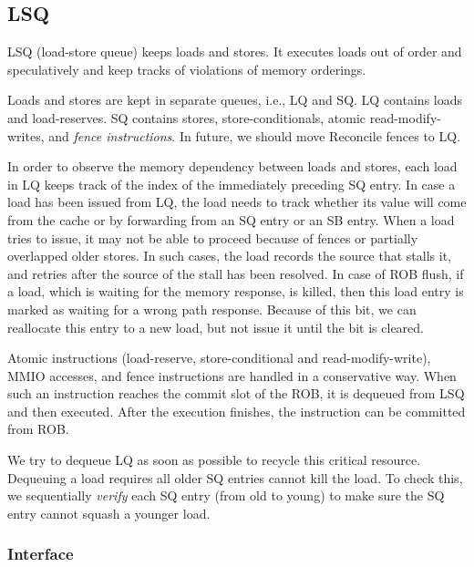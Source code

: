 \subsection{LSQ}\label{sec:lsq}

LSQ (load-store queue) keeps loads and stores.
It executes loads out of order and speculatively and keep tracks of violations of memory orderings.

Loads and stores are kept in separate queues, i.e., LQ and SQ.
LQ contains loads and load-reserves.
SQ contains stores, store-conditionals, atomic read-modify-writes, and \emph{fence instructions}.
In future, we should move Reconcile fences to LQ.

In order to observe the memory dependency between loads and stores, each load in LQ keeps track of the index of the immediately preceding SQ entry.
In case a load has been issued from LQ, the load needs to track whether its value will come from the cache or by forwarding from an SQ entry or an SB entry.
When a load tries to issue, it may not be able to proceed because of fences or partially overlapped older stores.
In such cases, the load records the source that stalls it, and retries after the source of the stall has been resolved.
In case of ROB flush, if a load, which is waiting for the memory response, is killed, then this load entry is marked as waiting for a wrong path response.
Because of this bit, we can reallocate this entry to a new load, but not issue it until the bit is cleared.

Atomic instructions (load-reserve, store-conditional and read-modify-write), MMIO accesses, and fence instructions are handled in a conservative way.
When such an instruction reaches the commit slot of the ROB, it is dequeued from LSQ and then executed.
After the execution finishes, the instruction can be committed from ROB.

We try to dequeue LQ as soon as possible to recycle this critical resource.
Dequeuing a load requires all older SQ entries cannot kill the load.
To check this, we sequentially \emph{verify} each SQ entry (from old to young) to make sure the SQ entry cannot squash a younger load.

\subsubsection{Interface}

